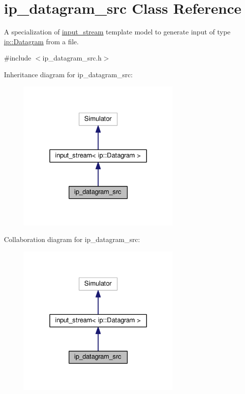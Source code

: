 \hypertarget{classip__datagram__src}{}\section{ip\+\_\+datagram\+\_\+src Class Reference}
\label{classip__datagram__src}


A specialization of \hyperlink{classinput__stream}{input\+\_\+stream} template model to generate input of type \hyperlink{structip_1_1Datagram}{ip\+::\+Datagram} from a file.  




{\ttfamily \#include $<$ip\+\_\+datagram\+\_\+src.\+h$>$}



Inheritance diagram for ip\+\_\+datagram\+\_\+src\+:\nopagebreak
\begin{figure}[H]
\begin{center}
\leavevmode
\includegraphics[width=227pt]{classip__datagram__src__inherit__graph}
\end{center}
\end{figure}


Collaboration diagram for ip\+\_\+datagram\+\_\+src\+:\nopagebreak
\begin{figure}[H]
\begin{center}
\leavevmode
\includegraphics[width=227pt]{classip__datagram__src__coll__graph}
\end{center}
\end{figure}
